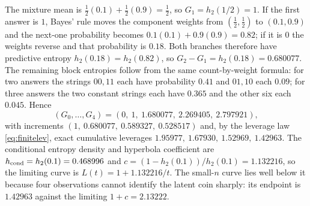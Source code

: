 \begin{example}
The mixture mean is $\tfrac12(0.1)+\tfrac12(0.9) = \tfrac12$, so
$G_1 = h_2(1/2) = 1$. If the first answer is $1$, Bayes' rule moves
the component weights from $(\tfrac12,\tfrac12)$ to $(0.1, 0.9)$ and
the next-one probability becomes $0.1(0.1)+0.9(0.9) = 0.82$; if it is
$0$ the weights reverse and that probability is $0.18$. Both branches
therefore have predictive entropy $h_2(0.18) = h_2(0.82)$, so
$G_2 - G_1 = h_2(0.18) = 0.680077$. The remaining block entropies
follow from the same count-by-weight formula: for two answers the
strings $00, 11$ each have probability $0.41$ and $01, 10$ each
$0.09$; for three answers the two constant strings each have
$0.365$ and the other six each $0.045$. Hence
%
\begin{equation}
  (G_0,\ldots,G_4) = (0,\ 1,\ 1.680077,\ 2.269405,\ 2.797921),
  \label{eq:coinworkedG}
\end{equation}
%
with increments $(1,\ 0.680077,\ 0.589327,\ 0.528517)$ and, by the
leverage law \eqref{eq:finitelev}, exact cumulative leverages
$1.95977,\ 1.67930,\ 1.52969,\ 1.42963$. The conditional entropy
density and hyperbola coefficient are
$h_{\rm cond} = h_2(0.1) = 0.468996$ and
$c = (1 - h_2(0.1))/h_2(0.1) = 1.132216$, so the limiting curve is
$L(t) = 1 + 1.132216/t$. The small-$n$ curve lies well below it
because four observations cannot identify the latent coin sharply:
its endpoint is $1.42963$ against the limiting $1 + c = 2.13222$.
\end{example}

